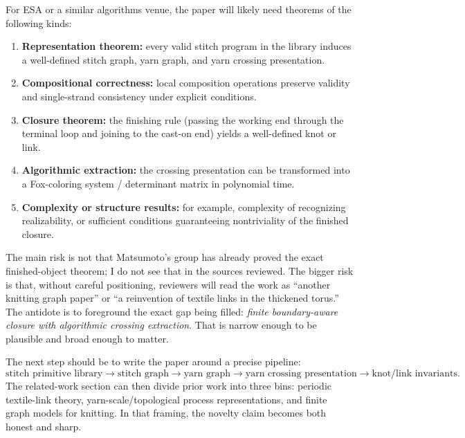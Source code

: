 \documentclass[11pt]{article}
\newcommand{\memoheader}[1]{\vspace{0.4em}{\large\bfseries\color{heading} #1}\par\vspace{0.2em}}
\begin{document}
For ESA or a similar algorithms venue, the paper will likely need theorems of the following kinds:
\begin{enumerate}[leftmargin=1.5em,itemsep=0.25em]
    \item \textbf{Representation theorem:} every valid stitch program in the library induces a well-defined stitch graph, yarn graph, and yarn crossing presentation.
    \item \textbf{Compositional correctness:} local composition operations preserve validity and single-strand consistency under explicit conditions.
    \item \textbf{Closure theorem:} the finishing rule (passing the working end through the terminal loop and joining to the cast-on end) yields a well-defined knot or link.
    \item \textbf{Algorithmic extraction:} the crossing presentation can be transformed into a Fox-coloring system / determinant matrix in polynomial time.
    \item \textbf{Complexity or structure results:} for example, complexity of recognizing realizability, or sufficient conditions guaranteeing nontriviality of the finished closure.
\end{enumerate}

\memoheader{Risk assessment}
The main risk is not that Matsumoto's group has already proved the exact finished-object theorem; I do not see that in the sources reviewed. The bigger risk is that, without careful positioning, reviewers will read the work as ``another knitting graph paper'' or ``a reinvention of textile links in the thickened torus.'' The antidote is to foreground the exact gap being filled: \emph{finite boundary-aware closure with algorithmic crossing extraction}. That is narrow enough to be plausible and broad enough to matter.

\memoheader{Practical recommendation}
The next step should be to write the paper around a precise pipeline:
\[
\text{stitch primitive library} \longrightarrow \text{stitch graph} \longrightarrow \text{yarn graph} \longrightarrow \text{yarn crossing presentation} \longrightarrow \text{knot/link invariants.}
\]
The related-work section can then divide prior work into three bins: periodic textile-link theory, yarn-scale/topological process representations, and finite graph models for knitting. In that framing, the novelty claim becomes both honest and sharp.



\end{document}
